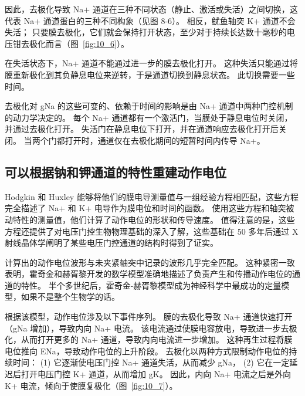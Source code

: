 因此，去极化导致 Na+ 通道在三种不同状态（静止、激活或失活）之间切换，这代表 Na+ 通道蛋白的三种不同构象（见图 8-6）。
相反，鱿鱼轴突 K+ 通道不会失活；
只要膜去极化，它们就会保持打开状态，至少对于持续长达数十毫秒的电压钳去极化而言（图~\ref{fig:10_6}）。


在失活状态下，Na+ 通道不能通过进一步的膜去极化打开。
这种失活只能通过将膜重新极化到其负静息电位来逆转，于是通道切换到静息状态。
此切换需要一些时间。


去极化对 gNa 的这些可变的、依赖于时间的影响是由 Na+ 通道中两种门控机制的动力学决定的。
每个 Na+ 通道都有一个激活门，当膜处于静息电位时关闭，并通过去极化打开。
失活门在静息电位下打开，并在通道响应去极化打开后关闭。
当两个门都打开时，通道仅在去极化期间的短暂时间内传导 Na+。



\subsection{可以根据钠和钾通道的特性重建动作电位}

Hodgkin 和 Huxley 能够将他们的膜电导测量值与一组经验方程相匹配，这些方程完全描述了 Na+ 和 K+ 电导作为膜电位和时间的函数。
使用这些方程和轴突被动特性的测量值，他们计算了动作电位的形状和传导速度。
值得注意的是，这些方程还提供了对电压门控生物物理基础的深入了解，这些基础在 50 多年后通过 X 射线晶体学阐明了某些电压门控通道的结构时得到了证实。


计算出的动作电位波形与未夹紧轴突中记录的波形几乎完全匹配。
这种紧密一致表明，霍奇金和赫胥黎开发的数学模型准确地描述了负责产生和传播动作电位的通道的特性。
半个多世纪后，霍奇金-赫胥黎模型成为神经科学中最成功的定量模型，如果不是整个生物学的话。


根据该模型，动作电位涉及以下事件序列。
膜的去极化导致 Na+ 通道快速打开（gNa 增加），导致内向 Na+ 电流。
该电流通过使膜电容放电，导致进一步去极化，从而打开更多的 Na+ 通道，导致内向电流进一步增加。 
这种再生过程将膜电位推向 ENa，导致动作电位的上升阶段。
去极化以两种方式限制动作电位的持续时间：
(1) 它逐渐使电压门控 Na+ 通道失活，从而减少 gNa，
(2) 它在一定延迟后打开电压门控 K+ 通道，从而增加 gK。
因此，内向 Na+ 电流之后是外向 K+ 电流，倾向于使膜复极化（图~\ref{fig:10_7}）。


